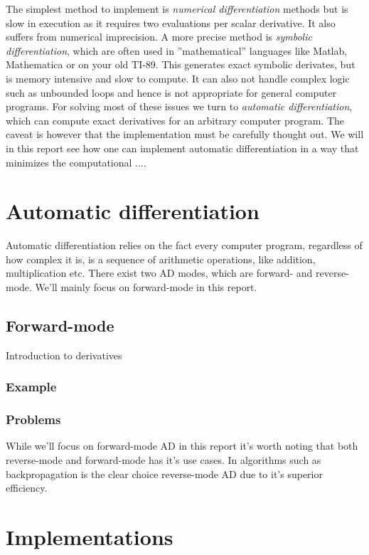 The simplest method to implement is \textit{numerical differentiation} methods 
but is slow in execution as it requires two evaluations per scalar derivative. 
It also suffers from numerical imprecision. A more precise method is 
\textit{symbolic differentiation}, which are often used in  ''mathematical'' languages
like Matlab, Mathematica or on your old TI-89.  This generates exact symbolic derivates, but 
is memory intensive and slow to compute. It can also not handle 
complex logic such as unbounded loops and hence is not appropriate for general computer programs. 
For solving most of these issues we turn to \textit{automatic differentiation}, which can 
compute exact derivatives for an arbitrary computer program. The caveat is however 
that the implementation must be carefully thought out. We will in this report
see how one can implement automatic differentiation in a way that minimizes 
the computational ....



\section{Automatic differentiation}
Automatic differentiation relies on the fact every computer program, regardless of how complex it is, 
is a sequence of arithmetic operations, like addition, multiplication etc. There exist 
two AD modes, which are forward- and reverse-mode. We'll mainly focus on forward-mode in this report. 

\subsection{Forward-mode}
Introduction to derivatives
\subsubsection{Example}
\subsubsection{Problems}

While we'll focus on forward-mode AD in this report it's worth noting 
that both reverse-mode and forward-mode has it's use cases. In algorithms such
as backpropagation is the clear choice reverse-mode AD due to it's superior
efficiency. 

\section{Implementations}
